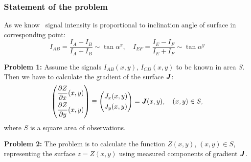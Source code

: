 \documentclass{beamer}
\begin{document}
\begin{frame}[c,allowframebreaks]
    \frametitle{Statement of the problem}
    As we know~\cite{PaluszynskiSlowko2005Vacuum, DrzazgaPaluszynski2005Measurement} signal
    intensity is proportional to inclination angle of surface in corresponding point:
    $$ I_{AB} = \frac{I_A - I_B}{I_A + I_B} \sim \tan{\alpha^x}, \quad I_{EF} = \frac{I_E - I_F}{I_E + I_F} \sim \tan{\alpha^y} $$


    \textbf{Problem 1:} Assume the signals $I_{AB}(x,y)$, $I_{CD}(x,y)$ to be known in area $S$.
    Then we have to calculate the gradient of the surface ${\textbf{\emph{J}}}$:
    \begin{equation}
        \label{problem_statement}
        \left(
        \begin{aligned}
            &\frac{\partial Z}{\partial x} (x,y)\\
            &\frac{\partial Z}{\partial y} (x,y)
        \end{aligned}
        \right)
        \equiv
        \left(
        \begin{aligned}
            &J_x (x,y)\\
            &J_y (x,y)
        \end{aligned}
        \right)
        = {\textbf{\emph{J}}}(x,y)
        , \quad (x,y) \in S,
    \end{equation}
    where $S$ is a square area of observations.

    \vfill

    \textbf{Problem 2:}
    The problem is to calculate the function $Z(x,y)$, $(x,y) \in S$,
    representing the surface $z = Z(x,y)$ using measured components of gradient ${\textbf{\emph{J}}}$.

\end{frame}
\end{document}
